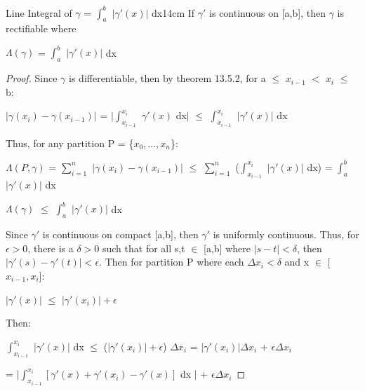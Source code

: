     \vspace{0.5cm}



    \begin{wtheorem}{Line Integral of $\gamma$ = $\int_a^b$ $|\gamma'(x)|$ dx}{14cm}
        If $\gamma'$ is continuous on [a,b], then $\gamma$ is rectifiable where

        \hspace{0.5cm}
        $\Lambda(\gamma)$ = $\int_a^b$ $|\gamma'(x)|$ dx        
    \end{wtheorem}
    
    \begin{proof}
        Since $\gamma$ is differentiable, then by {\color{red} theorem 13.5.2},
        for a $\leq$ $x_{i-1}$ $<$ $x_i$ $\leq$ b:

        \hspace{0.5cm}
        $|\gamma(x_i) - \gamma(x_{i-1})|$
        = $|\int_{x_{i-1}}^{x_i}$ $\gamma'(x)$ dx$|$
        $\leq$ $\int_{x_{i-1}}^{x_i}$ $|\gamma'(x)|$ dx

        Thus, for any partition P = \{$x_0,...,x_n$\}:

        \hspace{0.5cm}
        $\Lambda(P,\gamma)$
        = $\sum_{i=1}^n$ $|\gamma(x_i) - \gamma(x_{i-1})|$
        $\leq$ $\sum_{i=1}^n$ ($\int_{x_{i-1}}^{x_i}$ $|\gamma'(x)|$ dx)
        = $\int_a^b$ $|\gamma'(x)|$ dx

        \hspace{0.5cm}
        $\Lambda(\gamma)$ $\leq$ $\int_a^b$ $|\gamma'(x)|$ dx

        Since $\gamma'$ is continuous on compact [a,b], then $\gamma'$ is uniformly
        continuous.
        Thus, for $\epsilon > 0$, there is a $\delta > 0$ such that for all
        s,t $\in$ [a,b] where $|s-t| < \delta$, then
        $|\gamma'(s) - \gamma'(t)| < \epsilon$.
        Then for partition P where each $\Delta x_i < \delta$ and
        x $\in$ [$x_{i-1},x_i$]:

        \hspace{0.5cm}
        $|\gamma'(x)|$ $\leq$ $|\gamma'(x_i)| + \epsilon$

        Then:

        \hspace{0.5cm}
        $\int_{x_{i-1}}^{x_i}$ $|\gamma'(x)|$ dx
        $\leq$ ($|\gamma'(x_i)| + \epsilon$) $\Delta x_i$
        = $|\gamma'(x_i)|\Delta x_i$ + $\epsilon \Delta x_i$
        
        \hspace{3.3cm}
        = $|\int_{x_{i-1}}^{x_i} [\gamma'(x) + \gamma'(x_i) - \gamma'(x)]$ dx $|$
            + $\epsilon \Delta x_i$


\end{proof}
